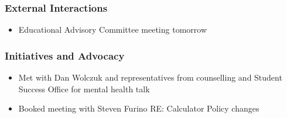 \subsubsection*{External Interactions}
\begin{itemize}
\item Educational Advisory Committee meeting tomorrow
\end{itemize}

\subsubsection*{Initiatives and Advocacy}
\begin{itemize}
\item Met with Dan Wolczuk and representatives from counselling and Student Success Office for mental health talk
\item Booked meeting with Steven Furino RE: Calculator Policy changes
\end{itemize}

